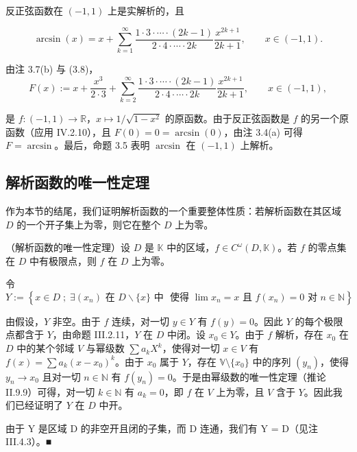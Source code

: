 \begin{corollary}

反正弦函数在 $ (-1,1) $ 上是实解析的，且

\[
\arcsin(x)=x+\sum_{k=1}^{\infty}\frac{1\cdot3\cdot\cdots\cdot(2k-1)}{2\cdot4\cdot\cdots\cdot2k}\frac{x^{2k+1}}{2k+1},\qquad x\in(-1,1).
\]

\proofhead
由注 3.7(b) 与 (3.8)，
\[
F(x):=x+\frac{x^{3}}{2\cdot3}+\sum_{k=2}^{\infty}\frac{1\cdot3\cdot\cdots\cdot(2k-1)}{2\cdot4\cdot\cdots\cdot2k}\frac{x^{2k+1}}{2k+1},\qquad x\in(-1,1),
\]

是 $f: (-1,1) \to \mathbb{R}$，$x \mapsto 1/\sqrt{1-x^2}$ 的原函数。由于反正弦函数是 $f$ 的另一个原函数（应用 IV.2.10），且 $F(0) = 0 = \arcsin(0)$，由注 3.4(a) 可得 $F = \arcsin$。最后，命题 3.5 表明 $\arcsin$ 在 $(-1,1)$ 上解析。

\end{corollary}

\subsection*{解析函数的唯一性定理}

作为本节的结尾，我们证明解析函数的一个重要整体性质：若解析函数在其区域 $D$ 的一个开子集上为零，则它在整个 $D$ 上为零。

\begin{theorem}

（解析函数的唯一性定理）设 $D$ 是 $\mathbb{K}$ 中的区域，$f \in C^\omega(D, \mathbb{K})$。若 $f$ 的零点集在 $D$ 中有极限点，则 $f$ 在 $D$ 上为零。

\proofhead
令
\[
Y:=\left\{x\in D\;;\;\exists\left(x_{n}\right)\text{ 在 }D\backslash\{x\}\text{ 中 }\text{ 使得 }\lim x_{n}=x\text{ 且 }f(x_{n})=0\text{ 对 }n\in\mathbb{N}\right\}
\]

由假设，$Y$ 非空。由于 $f$ 连续，对一切 $y \in Y$ 有 $f(y) = 0$。因此 $Y$ 的每个极限点都含于 $Y$，由命题 III.2.11，$Y$ 在 $D$ 中闭。设 $x_0 \in Y$。由于 $f$ 解析，存在 $x_0$ 在 $D$ 中的某个邻域 $V$ 与幂级数 $\sum a_k X^k$，使得对一切 $x \in V$ 有 $f(x) = \sum a_k (x - x_0)^k$。由于 $x_0$ 属于 $Y$，存在 $\mathbb{V}\setminus\{x_0\}$ 中的序列 $(y_n)$，使得 $y_n \to x_0$ 且对一切 $n \in \mathbb{N}$ 有 $f(y_n) = 0$。于是由幂级数的唯一性定理（推论 II.9.9）可得，对一切 $k \in \mathbb{N}$ 有 $a_k = 0$，即 $f$ 在 $V$ 上为零，且 $V$ 含于 $Y$。因此我们已经证明了 $Y$ 在 $D$ 中开。

由于 Y 是区域 D 的非空开且闭的子集，而 D 连通，我们有 Y = D（见注 III.4.3）。■

\end{theorem}

